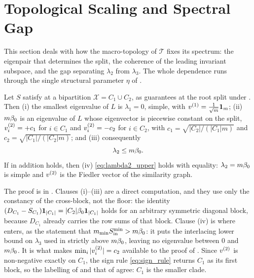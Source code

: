 \section{Topological Scaling and Spectral Gap}\label{sec:bridging}

This section deals with how the macro-topology of $\mathcal{T}$ fixes its spectrum: the eigenpair
that determines the split, the coherence of the leading invariant subspace, and the gap
separating $\lambda_2$ from $\lambda_3$. The whole dependence runs through the single
structural parameter $\eta$ of .

\begin{lemma}\label{lem:A-decomp}
Let $S$ satisfy  at a bipartition $\mathcal{X}=C_1\cup C_2$, as 
guarantees at the root split
under . Then (i) the smallest eigenvalue of $L$ is
$\lambda_1=0$, simple, with $v^{(1)}=\tfrac1{\sqrt m}\mathbf{1}_m$; (ii) $m\beta_0$ is an
eigenvalue of $L$ whose eigenvector is piecewise constant on the split,
$v^{(2)}_i=+c_1$ for $i\in C_1$ and $v^{(2)}_i=-c_2$ for $i\in C_2$, with $c_1=\sqrt{|C_2|/(|C_1|m)}$
and $c_2=\sqrt{|C_1|/(|C_2|m)}$; and (iii) consequently
\begin{equation}\label{eq:lambda2_upper}
   \lambda_2 \le m\beta_0 .
\end{equation}
If in addition  holds, then (iv) \eqref{eq:lambda2_upper} holds with
equality: $\lambda_2=m\beta_0$ is simple and $v^{(2)}$ is the Fiedler vector of the
similarity graph.
\end{lemma}

\noindent The proof is in . Clauses (i)--(iii) are a direct
computation, and they use only the constancy of the cross-block, not the floor:
the identity $(D_{C_1}-S_{C_1})\mathbf{1}_{|C_1|}=|C_2|\beta_0\mathbf{1}_{|C_1|}$ holds for an arbitrary symmetric diagonal
block, because $D_{C_1}$ already carries the row sums of that block. Clause (iv) is where
 enters, as the statement that $m_{\min}S_{\mathrm{in}}^{\min}>m\beta_0$: it puts
the interlacing lower bound on $\lambda_3$ used in  strictly above
$m\beta_0$, leaving no eigenvalue between $0$ and $m\beta_0$. It is what makes
$\min_i|v^{(2)}_i|=c_2$ available to the proof of . Since $v^{(2)}$ is
non-negative exactly on $C_1$, the sign rule \eqref{eq:sign_rule} returns $C_1$ as its
first block, so the labelling of  and that of 
agree: $C_1$ is the smaller clade.

